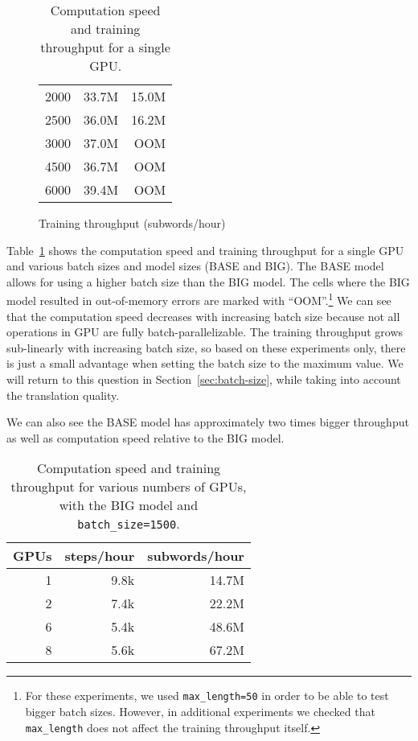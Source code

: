 \documentclass{pbmlarxiv} \pdfoutput=1
\def\Sref#1{Section~\ref{#1}}
\def\Tref#1{Table~\ref{#1}}
\begin{document}
\begin{table}[htb]
\begin{subfigure}[b]{0.45\textwidth}
\begin{tabular}{r|rr}
 2000       & 33.7M & 15.0M \\
 2500       & 36.0M & 16.2M \\
 3000       & 37.0M & OOM \\
 4500       & 36.7M & OOM \\
 6000       & 39.4M & OOM \\\hline
 \end{tabular}
 \caption{Training throughput (subwords/hour)}
 \label{tab:speed-b}
\end{subfigure}
\caption{Computation speed and training throughput for a single GPU.}
\label{tab:speed}
\end{table}

\Tref{tab:speed} shows the computation speed and training throughput for a single GPU
 and various batch sizes and model sizes (BASE and BIG).
The BASE model allows for using a higher batch size than the BIG model.
The cells where the BIG model resulted in out-of-memory errors are marked with ``OOM''.\footnote{
  For these experiments, we used \texttt{max\_length=50} in order to be able to test bigger batch sizes.
  However, in additional experiments we checked that \texttt{max\_length} does not affect the training throughput itself.
 }
We can see that the computation speed decreases with increasing batch size
 because not all operations in GPU are fully batch-parallelizable.
The training throughput grows sub-linearly with increasing batch size,
 so based on these experiments only, there is just a small advantage
 when setting the batch size to the maximum value.
We will return to this question in \Sref{sec:batch-size},
 while taking into account the translation quality.

We can also see the BASE model has approximately two times bigger throughput as well as computation speed
 relative to the BIG model.

\begin{table}[htb]\centering
\begin{tabular}{rrr}\hline
GPUs & steps/hour & subwords/hour \\\hline
1    &       9.8k & 14.7M \\
2    &       7.4k & 22.2M \\
6    &       5.4k & 48.6M \\
8    &       5.6k & 67.2M \\\hline
\end{tabular}
\caption{Computation speed and training throughput for various numbers of GPUs,
 with the BIG model and \texttt{batch\_size=1500}.}
\label{tab:speed-gpus}
\end{table}
\end{document}
